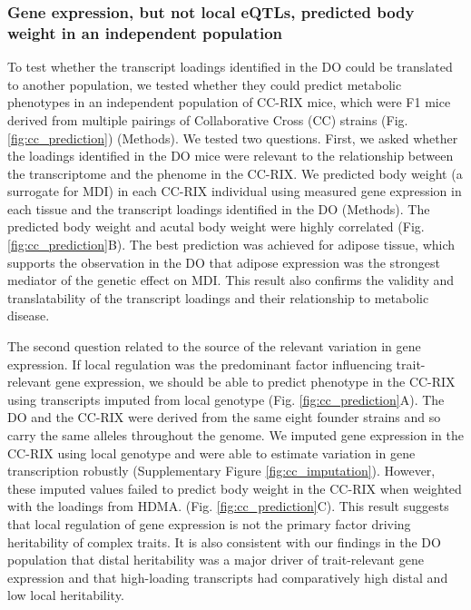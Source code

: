 \documentclass[
]{article}
\begin{document}
\subsubsection{Gene expression, but not local eQTLs, predicted body
weight in an independent
population}\label{gene-expression-but-not-local-eqtls-predicted-body-weight-in-an-independent-population}

To test whether the transcript loadings identified in the DO could be
translated to another population, we tested whether they could predict
metabolic phenotypes in an independent population of CC-RIX mice, which
were F1 mice derived from multiple pairings of Collaborative Cross (CC)
\cite{pmid28592495, pmid21411855, 
pmid17674098, pmid15514660} strains (Fig. \ref{fig:cc_prediction})
(Methods). We tested two questions. First, we asked whether the loadings
identified in the DO mice were relevant to the relationship between the
transcriptome and the phenome in the CC-RIX. We predicted body weight (a
surrogate for MDI) in each CC-RIX individual using measured gene
expression in each tissue and the transcript loadings identified in the
DO (Methods). The predicted body weight and acutal body weight were
highly correlated (Fig. \ref{fig:cc_prediction}B). The best prediction
was achieved for adipose tissue, which supports the observation in the
DO that adipose expression was the strongest mediator of the genetic
effect on MDI. This result also confirms the validity and
translatability of the transcript loadings and their relationship to
metabolic disease.

The second question related to the source of the relevant variation in
gene expression. If local regulation was the predominant factor
influencing trait-relevant gene expression, we should be able to predict
phenotype in the CC-RIX using transcripts imputed from local genotype
(Fig. \ref{fig:cc_prediction}A). The DO and the CC-RIX were derived from
the same eight founder strains and so carry the same alleles throughout
the genome. We imputed gene expression in the CC-RIX using local
genotype and were able to estimate variation in gene transcription
robustly (Supplementary Figure \ref{fig:cc_imputation}). However, these
imputed values failed to predict body weight in the CC-RIX when weighted
with the loadings from HDMA. (Fig. \ref{fig:cc_prediction}C). This
result suggests that local regulation of gene expression is not the
primary factor driving heritability of complex traits. It is also
consistent with our findings in the DO population that distal
heritability was a major driver of trait-relevant gene expression and
that high-loading transcripts had comparatively high distal and low
local heritability.
\end{document}
